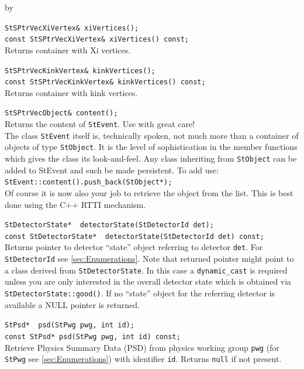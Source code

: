 \documentclass[twoside]{article}
\newcommand{\entrylabel}[1]{\mbox{\textbf{{#1}}}\hfil}%
\newenvironment{entry}
{\begin{list}{}%
    {\renewcommand{\makelabel}{\entrylabel}%
     \setlength{\labelwidth}{90pt}%
     \setlength{\leftmargin}{\labelwidth}
     \advance\leftmargin by \labelsep%
      }%
    }%
  {\end{list}}
\newcommand{\Entrylabel}[1]%
{\raisebox{0pt}[1ex][0pt]{\makebox[\labelwidth][l]%
    {\parbox[t]{\labelwidth}{\hspace{0pt}\textbf{{#1}}}}}}
\newenvironment{Entry}%
{\renewcommand{\entrylabel}{\Entrylabel}\begin{entry}}%
  {\end{entry}}
\begin{document}
\begin{Entry}
    \verb+StSPtrVecXiVertex& xiVertices();+\\
    \verb+const StSPtrVecXiVertex& xiVertices() const;+\\
    Returns container with Xi vertices.
    
    \verb+StSPtrVecKinkVertex& kinkVertices();+\\
    \verb+const StSPtrVecKinkVertex& kinkVertices() const;+\\
    Returns container with kink vertices.

    \verb+StSPtrVecObject& content();+\\
    Returns the content of \texttt{StEvent}. Use with great care!\\
    The class \texttt{StEvent} itself is, technically spoken, not
    much more than a container of objects of type \texttt{StObject}.
    It is the level of sophistication in the member functions
    which gives the class its look-and-feel. Any class inheriting
    from \texttt{StObject} can be added to StEvent and such be made
    persistent. To add use:\\
    \texttt{StEvent::content().push\_back(StObject*);}\\
    Of course it is now also your job to retrieve the object from the
    list. This is best done using the C++ RTTI mechanism.
    
    \verb+StDetectorState*  detectorState(StDetectorId det);+\\
    \verb+const StDetectorState*  detectorState(StDetectorId det) const;+\\
    Returns pointer to detector ``state'' object referring to detector \texttt{det}.
    For \texttt{StDetectorId} see \ref{sec:Enumerations}. Note that returned pointer
    might point to a class derived from \texttt{StDetectorState}. In this case
    a \texttt{dynamic\_cast} is required unless you are only interested in the overall
    detector state which is obtained via \texttt{StDetectorState::good()}.
    If no ``state'' object for the referring detector is available a NULL pointer
    is returned.

    \verb+StPsd*  psd(StPwg pwg, int id);+\\ 
    \verb+const StPsd* psd(StPwg pwg, int id) const;+\\
    Retrieve Physics Summary Data (PSD) from physics working group \texttt{pwg}
    (for \texttt{StPwg} see \ref{sec:Enumerations}) with identifier \texttt{id}.
    Returns \texttt{null} if not present.
        

\end{Entry}
\end{document}
